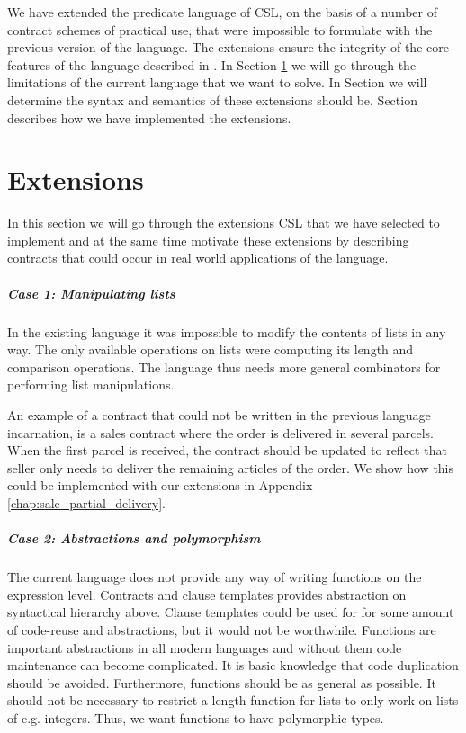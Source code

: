 \documentclass[10pt,a4paper,final,oneside,openany,article]{memoir}
\begin{document}
We have extended the predicate language of CSL, on the basis of a
number of contract schemes of practical use, that were impossible to
formulate with the previous version of the language. The extensions
ensure the integrity of the core features of the language described in
\cite{hvitved10}.  In Section \ref{extensions} we will go through the
limitations of the current language that we want to solve. In Section
we will determine the syntax and semantics of these extensions should
be. Section
\label{implementation} describes how we have implemented the
extensions.

\chapter{Extensions}
\label{extensions}
In this section we will go through the extensions CSL that we have
selected to implement and at the same time motivate these extensions
by describing contracts that could occur in real world applications of
the language.

\paragraph{Case 1: Manipulating lists} In the existing language it was
impossible to modify the contents of lists in any way. The only
available operations on lists were computing its length and comparison
operations. The language thus needs more general combinators for
performing list manipulations.

An example of a contract that could not be written in the previous
language incarnation, is a sales contract where the order is delivered
in several parcels. When the first parcel is received, the contract
should be updated to reflect that seller only needs to deliver the
remaining articles of the order.  We show how this could be
implemented with our extensions in Appendix
\ref{chap:sale_partial_delivery}.

\paragraph{Case 2: Abstractions and polymorphism} The current language
does not provide any way of writing functions on the expression
level. Contracts and clause templates provides abstraction on
syntactical hierarchy above. Clause templates could be used for for
some amount of code-reuse and abstractions, but it would not be
worthwhile. Functions are important abstractions in all modern
languages and without them code maintenance can become complicated. It
is basic knowledge that code duplication should be avoided.
Furthermore, functions should be as general as possible. It should not
be necessary to restrict a length function for lists to only work on
lists of e.g. integers. Thus, we want functions to have polymorphic
types.
\end{document}
